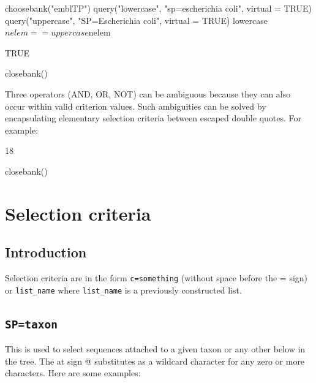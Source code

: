 \documentclass{article}
\begin{document}
\begin{Schunk}
\begin{Sinput}
 choosebank("emblTP")
 query("lowercase", "sp=escherichia coli", virtual = TRUE)
 query("uppercase", "SP=Escherichia coli", virtual = TRUE)
 lowercase$nelem == uppercase$nelem
\end{Sinput}
\begin{Soutput}
[1] TRUE
\end{Soutput}
\begin{Sinput}
 closebank()
\end{Sinput}
\end{Schunk}

Three operators (AND, OR, NOT) 
can be ambiguous because they can also occur within valid criterion values. 
Such ambiguities can be solved by encapsulating elementary selection 
criteria between escaped double quotes. For example:

\begin{Schunk}
\begin{Soutput}
[1] 18
\end{Soutput}
\begin{Sinput}
 closebank()
\end{Sinput}
\end{Schunk}

\section{Selection criteria}

\subsection{Introduction}

Selection criteria are in the form \texttt{c=something} (without space
before the = sign) or \texttt{list\_name} where \texttt{list\_name} is a
previously constructed list.

\subsection{\texttt{SP=taxon}}

This is used to select sequences attached to a given taxon or any other below in
the tree. The at sign @ substitutes as a wildcard character for any zero or more 
characters. Here are some examples:
\end{document}
